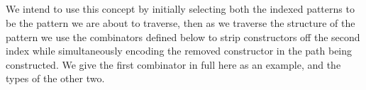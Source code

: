 \begin{code}%
\>[0]\AgdaSpace{}%
\AgdaSpace{}%
\AgdaSymbol{:}\AgdaSpace{}%
\AgdaSpace{}%
\AgdaSpace{}%
\AgdaSpace{}%
\AgdaSpace{}%
\AgdaSpace{}%
\AgdaSpace{}%
\AgdaSpace{}%
\<%
\\
\>[0][@{}l@{\AgdaIndent{0}}]%
\>[2]%
\>[8]\AgdaSymbol{:}\AgdaSpace{}%
\AgdaSpace{}%
\AgdaSpace{}%
\<%
\\
%
\>[2]%
\>[8]\AgdaSymbol{:}\AgdaSpace{}%
\AgdaSpace{}%
\AgdaSpace{}%
\AgdaSpace{}%
\AgdaSpace{}%
\AgdaSpace{}%
\AgdaSymbol{(}\AgdaSpace{}%
\AgdaSpace{}%
\AgdaSymbol{)}\AgdaSpace{}%
\<%
\\
%
\>[2]%
\>[8]\AgdaSymbol{:}\AgdaSpace{}%
\AgdaSpace{}%
\AgdaSpace{}%
\AgdaSpace{}%
\AgdaSpace{}%
\AgdaSpace{}%
\AgdaSymbol{(}\AgdaSpace{}%
\AgdaSpace{}%
\AgdaSymbol{)}\AgdaSpace{}%
\<%
\\
%
\>[2]%
\>[8]\AgdaSymbol{:}\AgdaSpace{}%
\AgdaSpace{}%
\AgdaSpace{}%
\AgdaSpace{}%
\AgdaSpace{}%
\AgdaSpace{}%
\AgdaSymbol{(}\AgdaSpace{}%
\AgdaSymbol{)}\AgdaSpace{}%
\<%
\end{code}
We intend to use this concept by initially selecting both the indexed patterns
to be the pattern we are about to traverse, then as we traverse the structure
of the pattern we use the combinators defined below to strip constructors off
the second index while simultaneously encoding the removed constructor in the 
path being constructed. We give the first combinator in full here as an example,
and the types of the other two.

